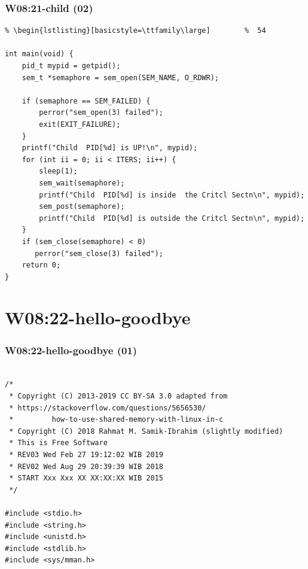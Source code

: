 \documentclass[aspectratio=169, xcolor=table, notheorems, hyperref={pdfpagelabels=false}]{beamer}
\begin{document}
\begin{frame}[fragile]
\frametitle{W08:21-child (02)}
\begin{lstlisting}[basicstyle=\ttfamily\footnotesize] %  72
% \begin{lstlisting}[basicstyle=\ttfamily\small]        %  65
% \begin{lstlisting}[basicstyle=\ttfamily\large]        %  54

int main(void) {
    pid_t mypid = getpid();
    sem_t *semaphore = sem_open(SEM_NAME, O_RDWR);

    if (semaphore == SEM_FAILED) {
        perror("sem_open(3) failed");
        exit(EXIT_FAILURE);
    }
    printf("Child  PID[%d] is UP!\n", mypid);
    for (int ii = 0; ii < ITERS; ii++) {
        sleep(1);
        sem_wait(semaphore);
        printf("Child  PID[%d] is inside  the Critcl Sectn\n", mypid);
        sem_post(semaphore);
        printf("Child  PID[%d] is outside the Critcl Sectn\n", mypid);
    }
    if (sem_close(semaphore) < 0) 
       perror("sem_close(3) failed");
    return 0;
}

\end{lstlisting}
\end{frame}

\section{W08:22-hello-goodbye}
\begin{frame}[fragile]
\frametitle{W08:22-hello-goodbye (01)}
\begin{lstlisting}[basicstyle=\ttfamily\small]        %  65
% \begin{lstlisting}[basicstyle=\ttfamily\large]        %  54

/*
 * Copyright (C) 2013-2019 CC BY-SA 3.0 adapted from 
 * https://stackoverflow.com/questions/5656530/
 *         how-to-use-shared-memory-with-linux-in-c
 * Copyright (C) 2018 Rahmat M. Samik-Ibrahim (slightly modified)
 * This is Free Software
 * REV03 Wed Feb 27 19:12:02 WIB 2019
 * REV02 Wed Aug 29 20:39:39 WIB 2018
 * START Xxx Xxx XX XX:XX:XX WIB 2015
 */

#include <stdio.h>
#include <string.h>
#include <unistd.h>
#include <stdlib.h>
#include <sys/mman.h>

\end{lstlisting}
\end{frame}
\end{document}
